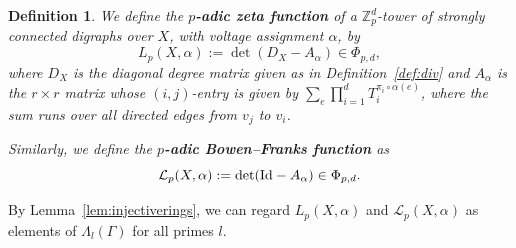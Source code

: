 \documentclass[11pt]{amsart}
\newtheorem{defn}[theorem]{Definition}
\numberwithin{equation}{section}
\theoremstyle{remark}
\newcommand{\?}{\stackrel{?}{=}}
\newcommand{\Zp}{\mathbb{Z}_p}
\begin{document}
\begin{defn}\label{def:MXalpha}
 We define the \textbf{$p$-adic zeta function} of a $\Zp^d$-tower of strongly connected digraphs over $X$, with voltage assignment $\alpha$, by
    \[
    L_p(X,\alpha):=\det(D_X-A_\alpha)\in\Phi_{p,d},
    \]
    where $D_X$ is the diagonal degree matrix given as in Definition~\ref{def:div} and $A_\alpha$ is the $r\times r$ matrix whose $(i,j)$-entry is given by $\displaystyle\sum_e\prod_{i=1}^dT_i^{\pi_i\circ\alpha(e)}$, where the sum runs over all directed edges from $v_j$ to $v_i$.

Similarly,  we define the \textbf{$p$-adic Bowen--Franks function} as $$\mathcal{L}_p(X,\alpha):=\det(\textup{Id}-A_\alpha)\in\Phi_{p,d}.$$
\end{defn}
By Lemma~\ref{lem:injectiverings}, we can regard $L_p(X,\alpha)$ and $\mathcal{L}_p(X,\alpha)$ as elements of $\Lambda_l(\Gamma)$ for all primes $l$.
\end{document}
